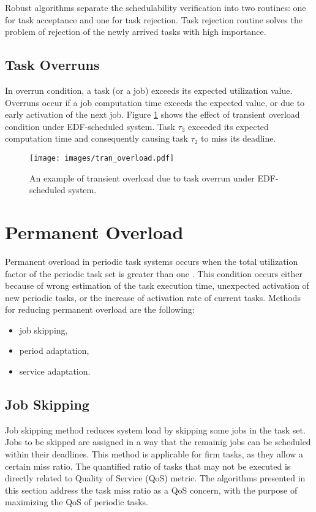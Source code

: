 Robust algorithms separate the schedulability verification into two routines: one for task acceptance and one for task rejection. 
Task rejection routine solves the problem of rejection of the newly arrived tasks with high importance.

\subsection{Task Overruns}
In overrun condition, a task (or a job) exceeds its expected utilization value.
Overruns occur if a job computation time exceeds the expected value, or due to early activation of the next job.
Figure \ref{transient_EDF} shows the effect of transient overload condition under EDF-scheduled system. Task $\tau_3$ exceeded its expected computation time and consequently causing task 
$\tau_2$ to miss its deadline.
\begin{figure}[ht]
    \centering
    \texttt{[image: images/tran\_overload.pdf]}
    \caption{An example of transient overload due to task overrun under EDF-scheduled system.}
    \label{transient_EDF}
\end{figure}

\section{Permanent Overload}

Permanent overload in periodic task systems occurs when the total utilization factor of the periodic task set is greater than one \cite{buttazzo2011hard}. 
This condition occurs either because of wrong estimation of the task execution time, unexpected activation of new periodic tasks, or the increase of activation rate of current tasks.
Methods for reducing permanent overload are the following:
\begin{itemize}
	\item{job skipping,}
	\item{period adaptation,}
	\item{service adaptation.}
\end{itemize}

\subsection{Job Skipping}
Job skipping method reduces system load by skipping some jobs in the task set. Jobs to be skipped are assigned in a way that the remainig jobs can be scheduled within their deadlines.
This method is applicable for firm tasks, as they allow a certain miss ratio. 
The quantified ratio of tasks that may not be executed is directly related to Quality of Service 
(QoS) metric. 
The algorithms presented in this section address the task miss ratio as a QoS concern, with the purpose of maximizing the QoS of periodic tasks.

